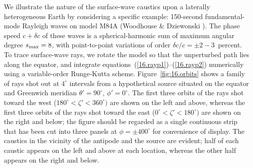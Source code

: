 We illustrate the nature of the surface-wave caustics
upon a laterally heterogeneous Earth by considering a
specific example: 150-second fundamental-mode Rayleigh
waves on model M84A (Woodhouse \& Dziewonski
\citeyear{woodhouse&dziewonski84}).  The
phase speed $c+\delta c$ of these waves is
a spherical-harmonic sum of maximum angular
degree $s_{\rm max}=8$, with point-to-point
variations of order $\delta c/c=\pm 2\!-\!3$~percent.
To trace surface-wave rays, we rotate the model so
that the unperturbed path lies along the equator,
and integrate equations~(\ref{16.rayp1})--(\ref{16.rayp2})
numerically using a variable-order Runge-Kutta
scheme.  Figure~\ref{fig:16.orbits}
shows a family of rays shot out at $4^\circ$ intervals from a
hypothetical source situated on the equator and Greenwich meridian
$\theta'=90^\circ$, $\phi'=0^\circ$.
The first three orbits of the rays shot toward the west
($180^\circ<\zeta'<360^\circ)$ are shown on the left and above,
whereas the first three orbits of the rays shot toward
the east ($0^\circ<\zeta'<180^\circ)$ are shown on the right
and below; the figure should be regarded as a single continuous
strip that has been cut into three panels at $\phi=\pm 400^{\circ}$
for convenience of display.
The caustics in the vicinity of the antipode and the source are evident;
half of each caustic appears on the left and above at each location,
whereas the other half appears on the right and below.
